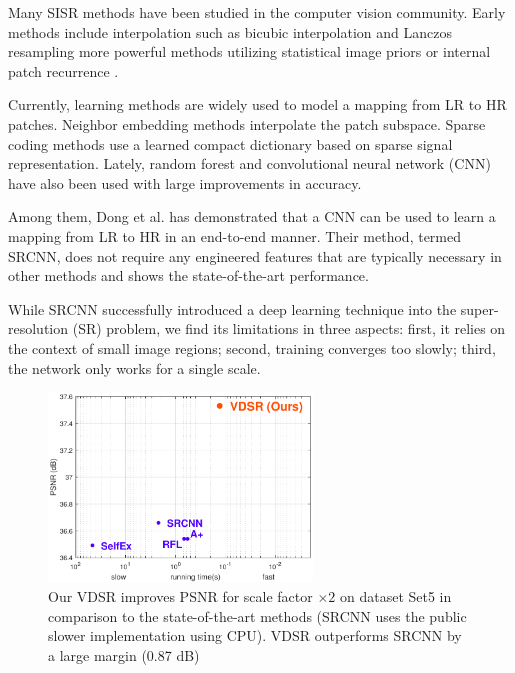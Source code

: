 \documentclass[10pt,twocolumn,letterpaper]{article}
\begin{document}
Many SISR methods have been studied in the computer vision community. Early methods include interpolation such as bicubic interpolation and Lanczos resampling \cite{duchon1979lanczos} more powerful methods utilizing statistical image priors \cite{sun2008image,Kim2010} or internal patch recurrence \cite{glasner2009super}.

Currently, learning methods are widely used to model a mapping from LR to HR patches. Neighbor embedding \cite{chang2004super,bevilacqua2012} methods interpolate the patch subspace. Sparse coding \cite{yang2010image,zeyde2012single,Timofte2013,Timofte} methods use a learned compact dictionary based on sparse signal representation. Lately, random forest \cite{schulter2015fast} and convolutional neural network (CNN) \cite{dong2015image} have also been used with large improvements in accuracy.

Among them, Dong et al. \cite{dong2015image} has demonstrated that a CNN can be used to learn a mapping from LR to HR in an end-to-end manner. Their method, termed SRCNN, does not require any engineered features that are typically necessary in other methods \cite{yang2010image,zeyde2012single,Timofte2013,Timofte} and shows the state-of-the-art performance.

While SRCNN successfully introduced a deep learning technique into the super-resolution (SR) problem, we find its limitations in three aspects: first, it relies on the context of small image regions; second, training converges too slowly; third, the network only works for a single scale.

\begin{figure}
\centering
{\graphicspath{{figs/figf/}}\includegraphics[width=7cm]{frontfig}}
\caption{Our VDSR improves PSNR for scale factor $\times2$ on dataset Set5 in comparison to the state-of-the-art methods (SRCNN uses the public slower implementation using CPU). VDSR outperforms SRCNN by a large margin (0.87 dB)}
\label{fig:method_comparison}
\end{figure}
\end{document}
